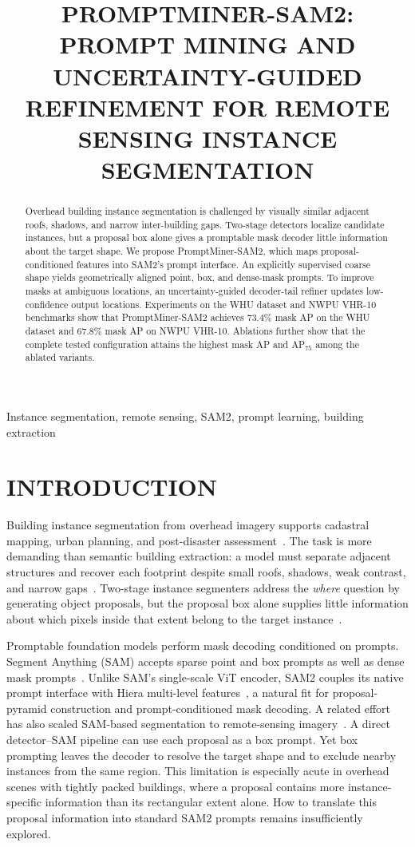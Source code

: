 \documentclass{article}
\title{PROMPTMINER-SAM2: PROMPT MINING AND\\UNCERTAINTY-GUIDED REFINEMENT FOR REMOTE\\SENSING INSTANCE SEGMENTATION}
\begin{document}
\maketitle

\begin{abstract}
Overhead building instance segmentation is challenged by visually similar
adjacent roofs, shadows, and narrow inter-building gaps. Two-stage detectors
localize candidate instances, but a proposal box alone gives a promptable mask
decoder little information about the target shape. We propose PromptMiner-SAM2,
which maps proposal-conditioned features into SAM2's prompt interface. An
explicitly supervised coarse shape yields geometrically aligned point, box, and
dense-mask prompts. To improve masks at ambiguous locations, an
uncertainty-guided decoder-tail refiner updates low-confidence output locations.
Experiments on the WHU dataset
and NWPU VHR-10 benchmarks show that PromptMiner-SAM2 achieves 73.4\% mask AP
on the WHU dataset and 67.8\% mask AP on NWPU VHR-10. Ablations further show that
the complete tested configuration attains the highest mask AP and AP$_{75}$
among the ablated variants.
\end{abstract}
\begin{keywords}
Instance segmentation, remote sensing, SAM2, prompt learning, building extraction
\end{keywords}

\section{INTRODUCTION}

Building instance segmentation from overhead imagery supports cadastral mapping,
urban planning, and post-disaster assessment~\cite{rsiisn,p2pformer}. The task is more demanding than
semantic building extraction: a model must separate adjacent structures and
recover each footprint despite small roofs, shadows, weak contrast, and narrow
gaps~\cite{rsiisn,p2pformer}. Two-stage instance segmenters address the \emph{where} question by
generating object proposals, but the proposal box alone supplies little
information about which pixels inside that extent belong to the target
instance~\cite{maskrcnn,htc}.

Promptable foundation models perform mask decoding conditioned on prompts.
Segment Anything (SAM) accepts sparse point and box prompts as well as dense
mask prompts~\cite{sam}. Unlike SAM's single-scale ViT encoder, SAM2 couples
its native prompt interface with Hiera multi-level features~\cite{sam2}, a
natural fit for proposal-pyramid construction and prompt-conditioned mask
decoding. A
related effort has also scaled SAM-based segmentation to remote-sensing
imagery~\cite{samrs}. A
direct detector--SAM pipeline can use each proposal as a box prompt. Yet box
prompting leaves the decoder to resolve the target shape and to exclude nearby
instances from the same region. This limitation is especially acute in
overhead scenes with tightly packed buildings, where a proposal contains more
instance-specific information than its rectangular extent alone. How to
translate this proposal information into standard SAM2 prompts
remains insufficiently explored.
\end{document}
